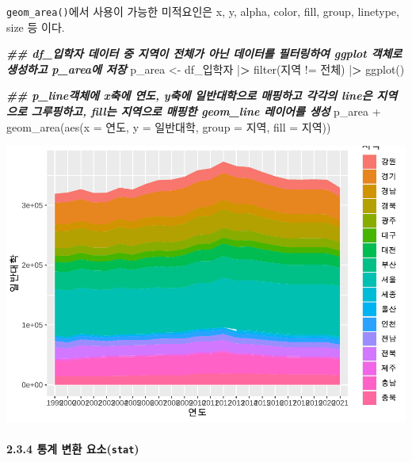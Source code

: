 \documentclass[
]{article}
\newenvironment{Shaded}{\begin{snugshade}}{\end{snugshade}}
\newcommand{\AttributeTok}[1]{\textcolor[rgb]{0.77,0.63,0.00}{#1}}
\newcommand{\DocumentationTok}[1]{\textcolor[rgb]{0.56,0.35,0.01}{\textbf{\textit{#1}}}}
\newcommand{\ErrorTok}[1]{\textcolor[rgb]{0.64,0.00,0.00}{\textbf{#1}}}
\newcommand{\FunctionTok}[1]{\textcolor[rgb]{0.00,0.00,0.00}{#1}}
\newcommand{\NormalTok}[1]{#1}
\newcommand{\OtherTok}[1]{\textcolor[rgb]{0.56,0.35,0.01}{#1}}
\newcommand{\SpecialCharTok}[1]{\textcolor[rgb]{0.00,0.00,0.00}{#1}}
\newcommand{\StringTok}[1]{\textcolor[rgb]{0.31,0.60,0.02}{#1}}
\begin{document}
\texttt{geom\_area()}에서 사용이 가능한 미적요인은 x, y, alpha, color, fill, group, linetype, size 등 이다.

\begin{Shaded}
\begin{Highlighting}[]
\DocumentationTok{\#\#  df\_입학자 데이터 중 지역이 전체가 아닌 데이터를 필터링하여 ggplot 객체로 생성하고 p\_area에 저장}
\NormalTok{p\_area }\OtherTok{\textless{}{-}}\NormalTok{ df\_입학자 }\SpecialCharTok{|}\ErrorTok{\textgreater{}} \FunctionTok{filter}\NormalTok{(지역 }\SpecialCharTok{!=} \StringTok{\textquotesingle{}전체\textquotesingle{}}\NormalTok{) }\SpecialCharTok{|}\ErrorTok{\textgreater{}}
  \FunctionTok{ggplot}\NormalTok{()}

\DocumentationTok{\#\#  p\_line객체에 x축에 연도, y축에 일반대학으로 매핑하고 각각의 line은 지역으로 그루핑하고, fill는 지역으로 매핑한 geom\_line 레이어를 생성}
\NormalTok{p\_area }\SpecialCharTok{+} 
  \FunctionTok{geom\_area}\NormalTok{(}\FunctionTok{aes}\NormalTok{(}\AttributeTok{x =}\NormalTok{ 연도, }\AttributeTok{y =}\NormalTok{ 일반대학, }\AttributeTok{group =}\NormalTok{ 지역, }\AttributeTok{fill =}\NormalTok{ 지역))}
\end{Highlighting}
\end{Shaded}

\includegraphics{chap3_files/figure-latex/unnamed-chunk-50-1.pdf}

\hypertarget{uxd1b5uxacc4-uxbcc0uxd658-uxc694uxc18cstat}{%
\paragraph{\texorpdfstring{2.3.4 통계 변환 요소(\texttt{stat})}{2.3.4 통계 변환 요소(stat)}}\label{uxd1b5uxacc4-uxbcc0uxd658-uxc694uxc18cstat}}
\end{document}
